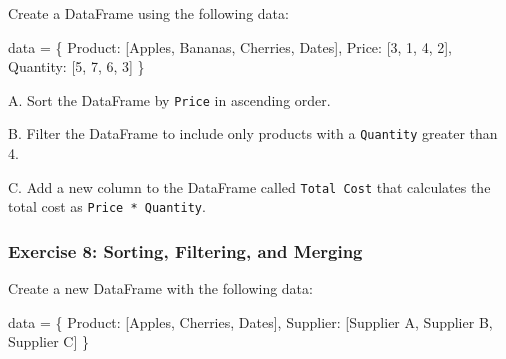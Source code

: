 \documentclass[
  letterpaper,
  DIV=11,
  numbers=noendperiod]{scrreprt}
\newenvironment{Shaded}{\begin{snugshade}}{\end{snugshade}}
\newcommand{\DecValTok}[1]{\textcolor[rgb]{0.68,0.00,0.00}{#1}}
\newcommand{\NormalTok}[1]{\textcolor[rgb]{0.00,0.23,0.31}{#1}}
\newcommand{\OperatorTok}[1]{\textcolor[rgb]{0.37,0.37,0.37}{#1}}
\newcommand{\StringTok}[1]{\textcolor[rgb]{0.13,0.47,0.30}{#1}}
\begin{document}
Create a DataFrame using the following data:

\begin{Shaded}
\begin{Highlighting}[]
\NormalTok{data }\OperatorTok{=}\NormalTok{ \{}
    \StringTok{\textquotesingle{}Product\textquotesingle{}}\NormalTok{: [}\StringTok{\textquotesingle{}Apples\textquotesingle{}}\NormalTok{, }\StringTok{\textquotesingle{}Bananas\textquotesingle{}}\NormalTok{, }\StringTok{\textquotesingle{}Cherries\textquotesingle{}}\NormalTok{, }\StringTok{\textquotesingle{}Dates\textquotesingle{}}\NormalTok{],}
    \StringTok{\textquotesingle{}Price\textquotesingle{}}\NormalTok{: [}\DecValTok{3}\NormalTok{, }\DecValTok{1}\NormalTok{, }\DecValTok{4}\NormalTok{, }\DecValTok{2}\NormalTok{],}
    \StringTok{\textquotesingle{}Quantity\textquotesingle{}}\NormalTok{: [}\DecValTok{5}\NormalTok{, }\DecValTok{7}\NormalTok{, }\DecValTok{6}\NormalTok{, }\DecValTok{3}\NormalTok{]}
\NormalTok{\}}
\end{Highlighting}
\end{Shaded}

A. Sort the DataFrame by \texttt{Price} in ascending order.

B. Filter the DataFrame to include only products with a
\texttt{Quantity} greater than 4.

C. Add a new column to the DataFrame called \texttt{Total\ Cost} that
calculates the total cost as \texttt{Price\ *\ Quantity}.

\hypertarget{exercise-8-sorting-filtering-and-merging}{%
\subsubsection{Exercise 8: Sorting, Filtering, and
Merging}\label{exercise-8-sorting-filtering-and-merging}}

Create a new DataFrame with the following data:

\begin{Shaded}
\begin{Highlighting}[]
\NormalTok{data }\OperatorTok{=}\NormalTok{ \{}
    \StringTok{\textquotesingle{}Product\textquotesingle{}}\NormalTok{: [}\StringTok{\textquotesingle{}Apples\textquotesingle{}}\NormalTok{, }\StringTok{\textquotesingle{}Cherries\textquotesingle{}}\NormalTok{, }\StringTok{\textquotesingle{}Dates\textquotesingle{}}\NormalTok{],}
    \StringTok{\textquotesingle{}Supplier\textquotesingle{}}\NormalTok{: [}\StringTok{\textquotesingle{}Supplier A\textquotesingle{}}\NormalTok{, }\StringTok{\textquotesingle{}Supplier B\textquotesingle{}}\NormalTok{, }\StringTok{\textquotesingle{}Supplier C\textquotesingle{}}\NormalTok{]}
\NormalTok{\}}
\end{Highlighting}
\end{Shaded}
\end{document}
